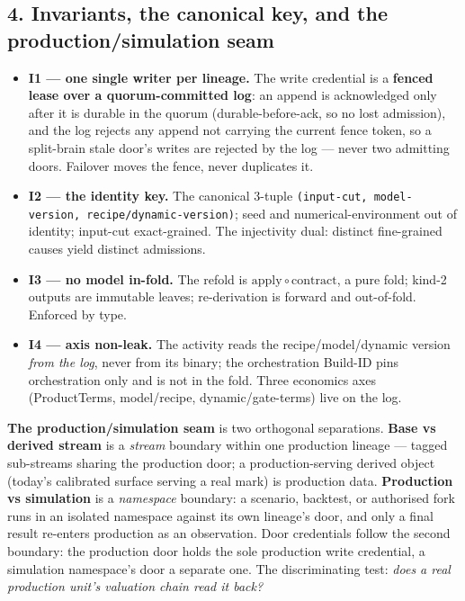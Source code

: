 \documentclass[11pt,a4paper]{article}
\begin{document}
\subsection*{4. Invariants, the canonical key, and the production/simulation seam}

\begin{itemize}[leftmargin=*, itemsep=1pt, topsep=2pt]
\item \textbf{I1 --- one single writer per lineage.} The write credential is a \textbf{fenced lease over
a quorum-committed log}: an append is acknowledged only after it is durable in the quorum
(durable-before-ack, so no lost admission), and the log rejects any append not carrying the current fence
token, so a split-brain stale door's writes are rejected by the log --- never two admitting doors.
Failover moves the fence, never duplicates it.
\item \textbf{I2 --- the identity key.} The canonical 3-tuple \texttt{(input-cut, model-version,
recipe/dynamic-version)}; seed and numerical-environment out of identity; input-cut exact-grained. The
injectivity dual: distinct fine-grained causes yield distinct admissions.
\item \textbf{I3 --- no model in-fold.} The refold is $\mathrm{apply}\circ\mathrm{contract}$, a pure fold;
kind-2 outputs are immutable leaves; re-derivation is forward and out-of-fold. Enforced by type.
\item \textbf{I4 --- axis non-leak.} The activity reads the recipe/model/dynamic version \emph{from the
log}, never from its binary; the orchestration Build-ID pins orchestration only and is not in the fold.
Three economics axes (ProductTerms, model/recipe, dynamic/gate-terms) live on the log.
\end{itemize}

\noindent\textbf{The production/simulation seam} is two orthogonal separations. \textbf{Base vs derived
stream} is a \emph{stream} boundary within one production lineage --- tagged sub-streams sharing the
production door; a production-serving derived object (today's calibrated surface serving a real mark) is
production data. \textbf{Production vs simulation} is a \emph{namespace} boundary: a scenario, backtest, or
authorised fork runs in an isolated namespace against its own lineage's door, and only a final result
re-enters production as an observation. Door credentials follow the second boundary: the production door
holds the sole production write credential, a simulation namespace's door a separate one. The
discriminating test: \emph{does a real production unit's valuation chain read it back?}
\end{document}
